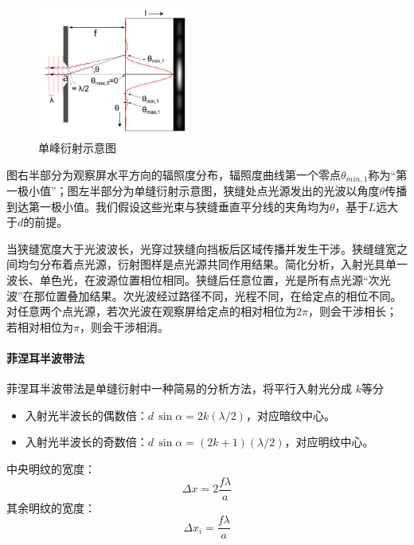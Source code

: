 \documentclass[a4paper]{../phyreport}
\begin{document}
\begin{figure}[H]
  \centering
  \includegraphics[width=0.45\textwidth]{fig/Single_Slit_Diffraction_First_Minimum.pdf}
  \caption{单峰衍射示意图}
  \label{单缝衍射示意图}
\end{figure}
图右半部分为观察屏水平方向的辐照度分布，辐照度曲线第一个零点$\theta _{min,1}$称为“第一极小值”；图左半部分为单缝衍射示意图，狭缝处点光源发出的光波以角度$\theta$传播到达第一极小值。我们假设这些光束与狭缝垂直平分线的夹角均为$\theta$，基于$L$远大于$d$的前提。

当狭缝宽度大于光波波长，光穿过狭缝向挡板后区域传播并发生干涉。狭缝缝宽之间均匀分布着点光源，衍射图样是点光源共同作用结果。简化分析，入射光具单一波长、单色光，在波源位置相位相同。狭缝后任意位置，光是所有点光源“次光波”在那位置叠加结果。次光波经过路径不同，光程不同，在给定点的相位不同。对任意两个点光源，若次光波在观察屏给定点的相对相位为$2\pi$，则会干涉相长；若相对相位为$\pi$，则会干涉相消。

\paragraph{菲涅耳半波带法}

菲涅耳半波带法是单缝衍射中一种简易的分析方法，将平行入射光分成 $k$等分
\begin{itemize}
  \item 入射光半波长的偶数倍：$d\,\sin \alpha =2k(\lambda /2)$，对应暗纹中心。
  \item 入射光半波长的奇数倍：${\displaystyle d\,\sin \alpha =(2k+1)(\lambda /2)}$，对应明纹中心。
\end{itemize}
中央明纹的宽度： 
\begin{equation}
  \label{equ:中央明纹宽度}
  \Delta x = 2 \frac{f \lambda}{a}
\end{equation}
其余明纹的宽度：
\begin{equation}
  \Delta x_i =  \frac{f \lambda}{a}
\end{equation}
\end{document}
